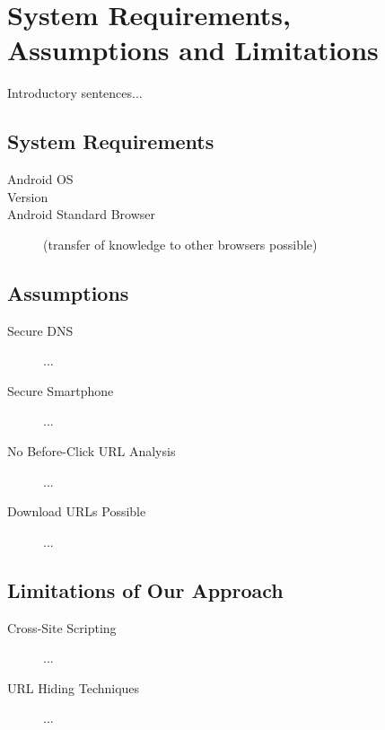 \section{System Requirements, Assumptions and Limitations}
\label{s:assumptions}
Introductory sentences...

\subsection{System Requirements}
\begin{description}
	\item[Android OS]
	\item[Version]
	\item[Android Standard Browser] (transfer of knowledge to other browsers possible)
\end{description}

\subsection{Assumptions}
\begin{description}
	\item[Secure DNS] ...
	\item[Secure Smartphone] ...
	\item[No Before-Click URL Analysis] ...
	\item[Download URLs Possible] ...
\end{description}

\subsection{Limitations of Our Approach}
\begin{description}
	\item[Cross-Site Scripting] ...
	\item[URL Hiding Techniques] ...
\end{description}

